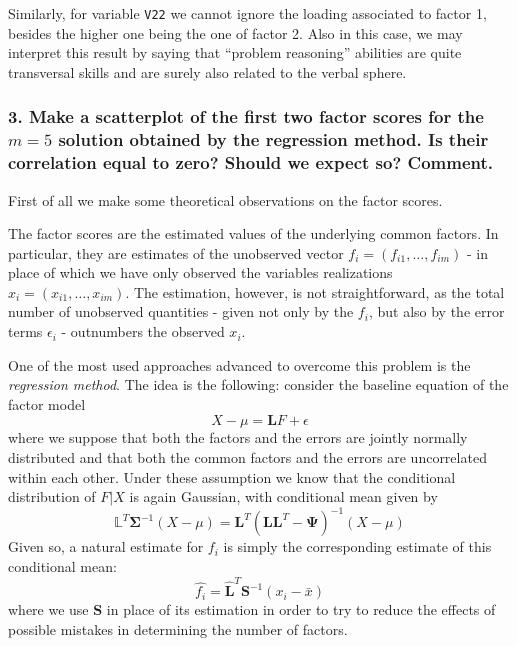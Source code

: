 \documentclass[
  letterpaper,
  DIV=11,
  numbers=noendperiod]{scrartcl}
\begin{document}
Similarly, for variable \texttt{V22} we cannot ignore the loading
associated to factor 1, besides the higher one being the one of factor
2. Also in this case, we may interpret this result by saying that
``problem reasoning'' abilities are quite transversal skills and are
surely also related to the verbal sphere.

\hypertarget{make-a-scatterplot-of-the-first-two-factor-scores-for-the-m-5-solution-obtained-by-the-regression-method.-is-their-correlation-equal-to-zero-should-we-expect-so-comment.}{%
\subsubsection{\texorpdfstring{3. Make a scatterplot of the first two
factor scores for the \(m = 5\) solution obtained by the regression
method. Is their correlation equal to zero? Should we expect so?
Comment.}{3. Make a scatterplot of the first two factor scores for the m = 5 solution obtained by the regression method. Is their correlation equal to zero? Should we expect so? Comment.}}\label{make-a-scatterplot-of-the-first-two-factor-scores-for-the-m-5-solution-obtained-by-the-regression-method.-is-their-correlation-equal-to-zero-should-we-expect-so-comment.}}

First of all we make some theoretical observations on the factor scores.

The factor scores are the estimated values of the underlying common
factors. In particular, they are estimates of the unobserved vector
\(f_i = (f_{i1}, \dots, f_{im})\) - in place of which we have only
observed the variables realizations \(x_i = (x_{i1}, \dots, x_{im})\).
The estimation, however, is not straightforward, as the total number of
unobserved quantities - given not only by the \(f_i\), but also by the
error terms \(\epsilon_i\) - outnumbers the observed \(x_i\).

One of the most used approaches advanced to overcome this problem is the
\emph{regression method}. The idea is the following: consider the
baseline equation of the factor model \[
  X - \mu = \mathbf{L}F + \epsilon
\] where we suppose that both the factors and the errors are jointly
normally distributed and that both the common factors and the errors are
uncorrelated within each other. Under these assumption we know that the
conditional distribution of \(F|X\) is again Gaussian, with conditional
mean given by \[
 \mathbb{L}^T\mathbf{\Sigma}^{-1}(X-\mu) = \mathbf{L}^T(\mathbf{LL}^T -\mathbf{\Psi})^{-1}(X-\mu)
\] Given so, a natural estimate for \(f_i\) is simply the corresponding
estimate of this conditional mean: \[
\hat{f_i} = \hat{\mathbf{L}}^T\mathbf{S}^{-1}(x_i-\bar{x})
\] where we use \(\mathbf{S}\) in place of its estimation in order to
try to reduce the effects of possible mistakes in determining the number
of factors.
\end{document}
